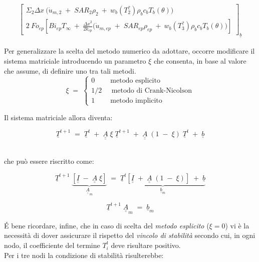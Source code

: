 \begin{landscape}
{\begin{minipage}{10cm}
{\begin{gather*}
{\begin{bmatrix}
							\Sigma_2 \Delta x \: \Big(\Dot{u}_{m,2} \;+\; SAR_{2} \rho_{2} \:+\:  w_b (T_2^?) \rho _b c_b T_b(\theta)\Big) \\
							2 \: Fo_{ep} \left[Bi_{ep} T_{\infty} \:+\: \frac{{\Delta x}^2}{2 k_{ep}} \Big(\Dot{u}_{m,ep} \;+\; SAR_{ep} \rho_{ep} \:+\:  w_b (T_3^?) \rho _b c_b T_b(\theta)\Big)\right]
						\end{bmatrix}
					}_{\underline{b}}
			\end{gather*}}
		\end{minipage}}
\end{landscape}


\newpage



\noindent
Per generalizzare la scelta del metodo numerico da adottare, occorre modificare il sistema matriciale introducendo un parametro $\xi$ che consenta, in base al valore che assume, di definire uno tra tali metodi.\\

$$
\xi \;=\;
\begin{cases}
	0 \;\;\;\;\;\;\;\; \mbox{metodo esplicito}\\
	1/2 \;\;\;\;\; \mbox{metodo di Crank-Nicolson}\\
	1 \;\;\;\;\;\;\;\; \mbox{metodo implicito}
\end{cases}
$$

\vspace{0.3cm}

\noindent
Il sistema matriciale allora diventa:

$$
\underline{T}^{t+1} \;=\; \underline{T}^{t} \;+\;  \underline{\underline{A}} \;  \xi \; \underline{T}^{t+1} \;+\;  \underline{\underline{A}} \;  \left(1 \;-\; \xi \right) \;  \underline{T}^{t} \;+\;  \underline{b}
$$

\noindent
\\che può essere riscritto come:

$$
\underline{T}^{t+1} \; \underbrace{\left[\underline{\underline{I}} \;-\; \underline{\underline{A}} \;  \xi \right]}_{\underline{\underline{A}}_m} \;=\; \underbrace{ 
	\underline{T}^{t} \left[ \underline{\underline{I}} \;+\;  \underline{\underline{A}} \;  \left(1 \;-\; \xi \right) \right] \;+\;  \underline{b}}_{\underline{b}_m}
$$

$$
\underline{T}^{t+1} \; \underline{\underline{A}}_m \;=\; \underline{b}_m
$$

\noindent
É bene ricordare, infine, che in caso di scelta del \textit{metodo esplicito} ($\xi =0 $) vi è la necessità di dover assicurare il rispetto del \textit{vincolo di stabilità} secondo cui, in ogni nodo, il coefficiente del termine $T_i^t$ deve risultare positivo.\\
Per i tre nodi la condizione di stabilità risulterebbe:

